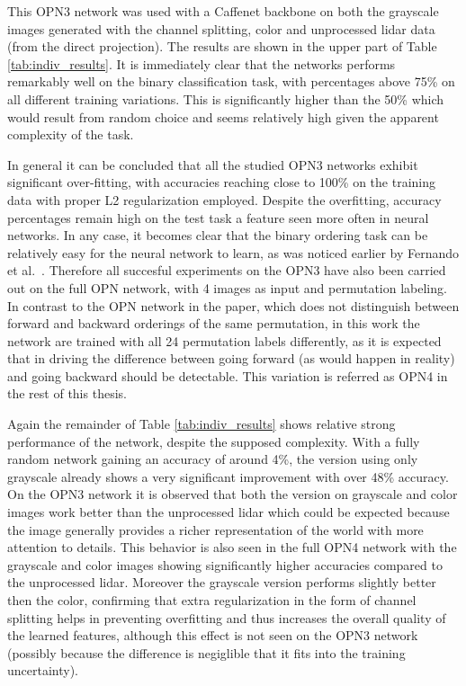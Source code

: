 This OPN3 network was used with a Caffenet backbone on both the grayscale images generated with the channel splitting, color and unprocessed lidar data (from the direct projection). The results are shown in the upper part of Table \ref{tab:indiv_results}. It is immediately clear that the networks performs remarkably well on the binary classification task, with percentages above 75\% on all different training variations. This is significantly higher than the 50\% which would result from random choice and seems relatively high given the apparent complexity of the task. 


In general it can be concluded that all the studied OPN3 networks exhibit significant over-fitting, with accuracies reaching close to 100\% on the training data with proper L2 regularization employed. Despite the overfitting, accuracy percentages remain high on the test task a feature seen more often in neural networks. In any case, it becomes clear that the binary ordering task can be relatively easy for the neural network to learn, as was noticed earlier by Fernando et al.~\cite{fernando2017}. Therefore all succesful experiments on the OPN3 have also been carried out on the full OPN network\cite{lee2017}, with 4 images as input and permutation labeling. In contrast to the OPN network in the paper, which does not distinguish between forward and backward orderings of the same permutation, in this work the network are trained with all 24 permutation labels differently, as it is expected that in driving the difference between going forward (as would happen in reality) and going backward should be detectable. This variation is referred as OPN4 in the rest of this thesis.

Again the remainder of Table \ref{tab:indiv_results} shows relative strong performance of the network, despite the supposed complexity. With a fully random network gaining an accuracy of around 4\%, the version using only grayscale already shows a very significant improvement with over 48\% accuracy. On the OPN3 network it is observed that both the version on grayscale and color images work better than the unprocessed lidar which could be expected because the image generally provides a richer representation of the world with more attention to details. This behavior is also seen in the full OPN4 network with the grayscale and color images showing significantly higher accuracies compared to the unprocessed lidar. Moreover  the grayscale version performs slightly better then the color, confirming that extra regularization in the form of channel splitting helps in preventing overfitting and thus increases the overall quality of the learned features, although this effect is not seen on the OPN3 network (possibly because the difference is negiglible that it fits into the training uncertainty).

